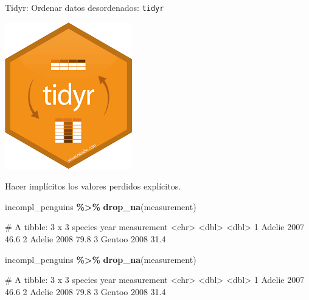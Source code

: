 \documentclass[
  ignorenonframetext,
  aspectratio=169]{beamer}
\newenvironment{Shaded}{\begin{snugshade}}{\end{snugshade}}
\newcommand{\FunctionTok}[1]{\textcolor[rgb]{0.13,0.29,0.53}{\textbf{#1}}}
\newcommand{\NormalTok}[1]{#1}
\newcommand{\SpecialCharTok}[1]{\textcolor[rgb]{0.81,0.36,0.00}{\textbf{#1}}}
\let\oldverbatim\verbatim
\let\endoldverbatim\endverbatim
\renewenvironment{verbatim}{\tiny\oldverbatim}{\endoldverbatim}
\begin{document}
\begin{frame}[fragile]{Tidyr: Ordenar datos desordenados:
\texttt{tidyr}}
\label{tidyr-ordenar-datos-desordenados-tidyr-15}
\begin{flushright}\includegraphics[width=0.05\linewidth]{Imgs/logo_tidyr} \end{flushright}

Hacer implícitos los valores perdidos explícitos.

\begin{Shaded}
\begin{Highlighting}[]
\NormalTok{incompl\_penguins }\SpecialCharTok{\%\textgreater{}\%} 
  \FunctionTok{drop\_na}\NormalTok{(measurement)}
\end{Highlighting}
\end{Shaded}

\begin{verbatim}
# A tibble: 3 x 3
  species  year measurement
  <chr>   <dbl>       <dbl>
1 Adelie   2007        46.6
2 Adelie   2008        79.8
3 Gentoo   2008        31.4
\end{verbatim}

\begin{Shaded}
\begin{Highlighting}[]
\NormalTok{incompl\_penguins }\SpecialCharTok{\%\textgreater{}\%} 
  \FunctionTok{drop\_na}\NormalTok{(measurement)}
\end{Highlighting}
\end{Shaded}

\begin{verbatim}
# A tibble: 3 x 3
  species  year measurement
  <chr>   <dbl>       <dbl>
1 Adelie   2007        46.6
2 Adelie   2008        79.8
3 Gentoo   2008        31.4
\end{verbatim}
\end{frame}
\end{document}
